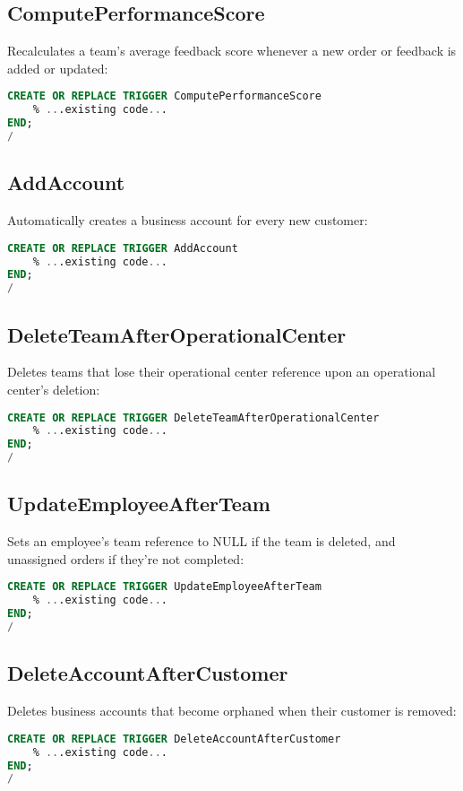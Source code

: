 \subsection*{ComputePerformanceScore}
Recalculates a team's average feedback score whenever a new order or feedback is added or updated:
\begin{lstlisting}[language=SQL]
CREATE OR REPLACE TRIGGER ComputePerformanceScore
    % ...existing code...
END;
/
\end{lstlisting}

\subsection*{AddAccount}
Automatically creates a business account for every new customer:
\begin{lstlisting}[language=SQL]
CREATE OR REPLACE TRIGGER AddAccount
    % ...existing code...
END;
/
\end{lstlisting}

\subsection*{DeleteTeamAfterOperationalCenter}
Deletes teams that lose their operational center reference upon an operational center's deletion:
\begin{lstlisting}[language=SQL]
CREATE OR REPLACE TRIGGER DeleteTeamAfterOperationalCenter
    % ...existing code...
END;
/
\end{lstlisting}

\subsection*{UpdateEmployeeAfterTeam}
Sets an employee's team reference to NULL if the team is deleted, and unassigned orders if they're not completed:
\begin{lstlisting}[language=SQL]
CREATE OR REPLACE TRIGGER UpdateEmployeeAfterTeam
    % ...existing code...
END;
/
\end{lstlisting}

\subsection*{DeleteAccountAfterCustomer}
Deletes business accounts that become orphaned when their customer is removed:
\begin{lstlisting}[language=SQL]
CREATE OR REPLACE TRIGGER DeleteAccountAfterCustomer
    % ...existing code...
END;
/
\end{lstlisting}

